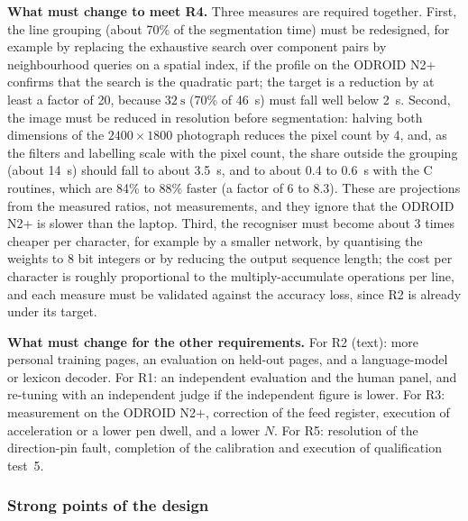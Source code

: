         \textbf{What must change to meet R4.}
        Three measures are required together.
        First, the line grouping (about 70\% of the segmentation time) must be redesigned, for example by replacing the exhaustive search over component pairs by neighbourhood queries on a spatial index, if the profile on the ODROID N2+ confirms that the search is the quadratic part; the target is a reduction by at least a factor of 20, because $32~\mathrm{s}$ (70\% of 46~s) must fall well below 2~s.
        Second, the image must be reduced in resolution before segmentation: halving both dimensions of the $2400\times1800$ photograph reduces the pixel count by 4, and, as the filters and labelling scale with the pixel count, the share outside the grouping (about 14~s) should fall to about 3.5~s, and to about 0.4 to 0.6~s with the C routines, which are 84\% to 88\% faster (a factor of 6 to 8.3).
        These are projections from the measured ratios, not measurements, and they ignore that the ODROID N2+ is slower than the laptop.
        Third, the recogniser must become about 3 times cheaper per character, for example by a smaller network, by quantising the weights to 8 bit integers or by reducing the output sequence length; the cost per character is roughly proportional to the multiply-accumulate operations per line, and each measure must be validated against the accuracy loss, since R2 is already under its target.

        \textbf{What must change for the other requirements.}
        For R2 (text): more personal training pages, an evaluation on held-out pages, and a language-model or lexicon decoder.
        For R1: an independent evaluation and the human panel, and re-tuning with an independent judge if the independent figure is lower.
        For R3: measurement on the ODROID N2+, correction of the feed register, execution of acceleration or a lower pen dwell, and a lower $N$.
        For R5: resolution of the direction-pin fault, completion of the calibration and execution of qualification test~5.

    \subsubsection{Strong points of the design}
    \label{sec:dis-strong}

